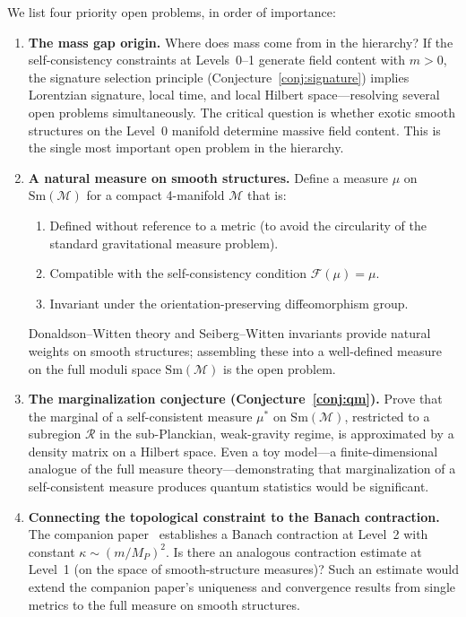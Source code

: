 \documentclass[12pt,a4paper]{article}
\theoremstyle{definition}
\theoremstyle{remark}
\begin{document}
We list four priority open problems, in order of importance:

\begin{enumerate}

\item \textbf{The mass gap origin.}
Where does mass come from in the hierarchy? If the self-consistency constraints
at Levels~0--1 generate field content with $m > 0$, the signature selection
principle (Conjecture~\ref{conj:signature}) implies Lorentzian signature, local
time, and local Hilbert space---resolving several open problems simultaneously.
The critical question is whether exotic smooth structures on the Level~0
manifold determine massive field content. This is the single most important
open problem in the hierarchy.

\item \textbf{A natural measure on smooth structures.}
Define a measure $\mu$ on $\mathrm{Sm}(\mathcal{M})$ for a compact
4-manifold $\mathcal{M}$ that is:
\begin{enumerate}
\item Defined without reference to a metric (to avoid the circularity of the
standard gravitational measure problem).
\item Compatible with the self-consistency condition $\mathcal{F}(\mu) = \mu$.
\item Invariant under the orientation-preserving diffeomorphism group.
\end{enumerate}
Donaldson--Witten theory and Seiberg--Witten invariants provide natural weights
on smooth structures; assembling these into a well-defined measure on the full
moduli space $\mathrm{Sm}(\mathcal{M})$ is the open problem.

\item \textbf{The marginalization conjecture (Conjecture~\ref{conj:qm}).}
Prove that the marginal of a self-consistent measure $\mu^*$ on
$\mathrm{Sm}(\mathcal{M})$, restricted to a subregion $\mathcal{R}$ in
the sub-Planckian, weak-gravity regime, is approximated by a density matrix
on a Hilbert space. Even a toy model---a finite-dimensional analogue of the
full measure theory---demonstrating that marginalization of a self-consistent
measure produces quantum statistics would be significant.

\item \textbf{Connecting the topological constraint to the Banach contraction.}
The companion paper~\cite{fixed_point} establishes a Banach contraction at
Level~2 with constant $\kappa \sim (m/M_P)^2$. Is there an analogous
contraction estimate at Level~1 (on the space of smooth-structure measures)?
Such an estimate would extend the companion paper's uniqueness and convergence
results from single metrics to the full measure on smooth structures.

\end{enumerate}
\end{document}
